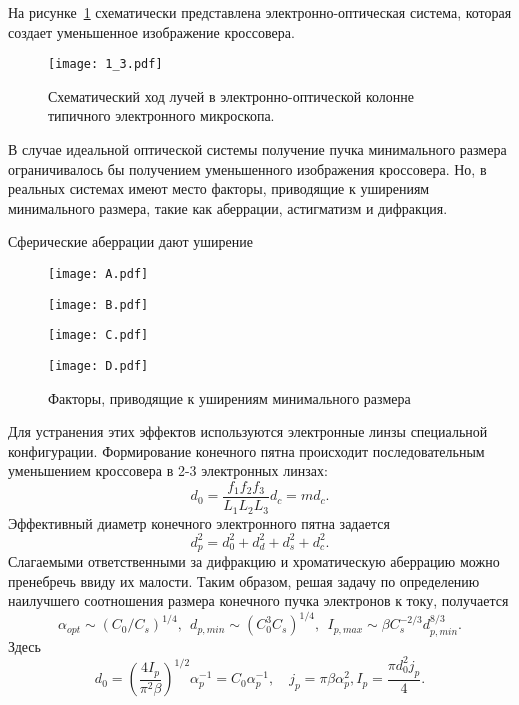 На рисунке~\ref{fig:3} схематически представлена электронно-оптическая система, которая создает уменьшенное изображение кроссовера.
\begin{figure}[H]
\center
\texttt{[image: 1\_3.pdf]}
\caption{Схематический ход лучей в электронно-оптической колонне типичного электронного микроскопа.}
\label{fig:3}
\end{figure}

В случае идеальной оптической системы получение пучка минимального размера ограничивалось бы получением уменьшенного изображения кроссовера. Но, в реальных системах имеют место факторы, приводящие к уширениям минимального размера, такие как аберрации, астигматизм и дифракция.

Сферические аберрации дают уширение

\begin{figure}
    \center
    \texttt{[image: A.pdf]}
    \parbox[t]{.95\textwidth}{}
    \texttt{[image: B.pdf]}
    \parbox[t]{.95\textwidth}{}
    \texttt{[image: C.pdf]}
    \parbox[t]{.95\textwidth}{}
    \texttt{[image: D.pdf]}
    \parbox[t]{.95\textwidth}{}
    \caption{Факторы, приводящие к уширениям минимального размера}
\end{figure}

Для устранения этих эффектов используются электронные линзы специальной конфигурации.
Формирование конечного пятна происходит последовательным уменьшением кроссовера в 2-3 электронных линзах:
\begin{equation}
d_0= \frac{f_1 f_2 f_3}{L_1 L_2 L_3} d_c = md_c.
\label{eq:A4}
\end{equation}
Эффективный диаметр конечного электронного пятна задается
\begin{equation}
d_p^2=d_0^2+d_d^2+d_s^2+d_c^2.
\label{eq:A5}
\end{equation}
Слагаемыми ответственными за дифракцию и хроматическую аберрацию можно пренебречь ввиду их малости. Таким образом, решая задачу по определению наилучшего соотношения размера конечного пучка электронов к току, получается
\begin{equation}
\alpha_{opt}\sim\left(C_0/C_s\right)^{1/4},\>\>d_{p,min}\sim\left(C_0^3 C_s\right)^{1/4},\>\> I_{p,max}\sim \beta C_s^{-2/3} d_{p,min}^{8/3}.\label{eq:A6}
\end{equation}
Здесь
\[
    d_0= \left(\frac{4I_p}{\pi^2 \beta}\right)^{1/2} \alpha_p^{-1}=C_0\alpha_p^{-1},
    \quad j_p=\pi \beta \alpha_p^2 , I_p= \frac{\pi d_0^2 j_p}{4}.
\]

